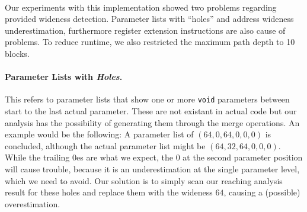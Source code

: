 %

~\\
Our experiments with this implementation showed two problems regarding provided wideness detection.  Parameter lists with ``holes'' and address wideness underestimation, furthermore register extension instructions are also cause of problems. To reduce runtime, we also restricted the maximum path depth to 10 blocks.

\paragraph{Parameter Lists with \textit{Holes}.} This refers to parameter lists that show one or more \texttt{void} parameters between start to the last actual parameter. 
These are not existant in actual code but our analysis has the possibility of generating them through the merge operations. An example would be the following: 
A parameter list of $(64, 0, 64, 0, 0, 0)$ is concluded, although the actual parameter list might be $(64, 32, 64, 0, 0, 0)$. While the trailing 0es are 
what we expect, the 0 at the second parameter position will cause trouble, because it is an underestimation at the single parameter level, which we need to avoid.
Our solution is to simply scan our reaching analysis result for these holes and replace them with the wideness $64$, causing a (possible) overestimation.

